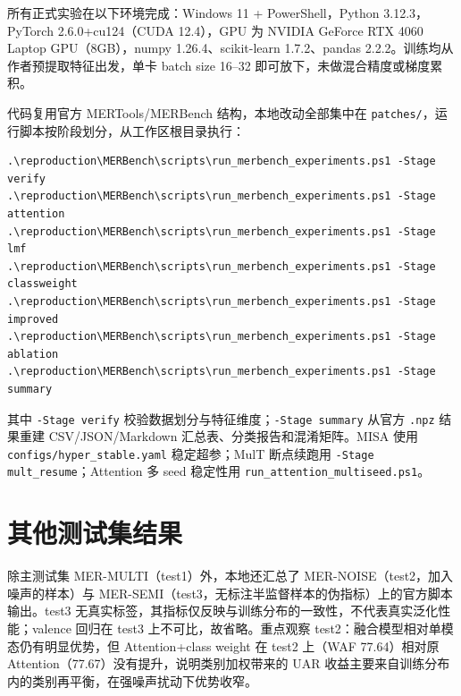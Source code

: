 ﻿\documentclass[a4paper,11pt]{ctexart}
\begin{document}
所有正式实验在以下环境完成：Windows 11 + PowerShell，Python 3.12.3，PyTorch 2.6.0+cu124（CUDA 12.4），GPU 为 NVIDIA GeForce RTX 4060 Laptop GPU（8GB），numpy 1.26.4、scikit-learn 1.7.2、pandas 2.2.2。训练均从作者预提取特征出发，单卡 batch size 16--32 即可放下，未做混合精度或梯度累积。

代码复用官方 MERTools/MERBench 结构，本地改动全部集中在 \texttt{patches/}，运行脚本按阶段划分，从工作区根目录执行：
\begin{verbatim}
.\reproduction\MERBench\scripts\run_merbench_experiments.ps1 -Stage verify
.\reproduction\MERBench\scripts\run_merbench_experiments.ps1 -Stage attention
.\reproduction\MERBench\scripts\run_merbench_experiments.ps1 -Stage lmf
.\reproduction\MERBench\scripts\run_merbench_experiments.ps1 -Stage classweight
.\reproduction\MERBench\scripts\run_merbench_experiments.ps1 -Stage improved
.\reproduction\MERBench\scripts\run_merbench_experiments.ps1 -Stage ablation
.\reproduction\MERBench\scripts\run_merbench_experiments.ps1 -Stage summary
\end{verbatim}
其中 \texttt{-Stage verify} 校验数据划分与特征维度；\texttt{-Stage summary} 从官方 \texttt{.npz} 结果重建 CSV/JSON/Markdown 汇总表、分类报告和混淆矩阵。MISA 使用 \texttt{configs/hyper\_stable.yaml} 稳定超参；MulT 断点续跑用 \texttt{-Stage mult\_resume}；Attention 多 seed 稳定性用 \texttt{run\_attention\_multiseed.ps1}。

\section{其他测试集结果}

除主测试集 MER-MULTI（test1）外，本地还汇总了 MER-NOISE（test2，加入噪声的样本）与 MER-SEMI（test3，无标注半监督样本的伪指标）上的官方脚本输出。test3 无真实标签，其指标仅反映与训练分布的一致性，不代表真实泛化性能；valence 回归在 test3 上不可比，故省略。重点观察 test2：融合模型相对单模态仍有明显优势，但 Attention+class weight 在 test2 上（WAF 77.64）相对原 Attention（77.67）没有提升，说明类别加权带来的 UAR 收益主要来自训练分布内的类别再平衡，在强噪声扰动下优势收窄。
\end{document}
